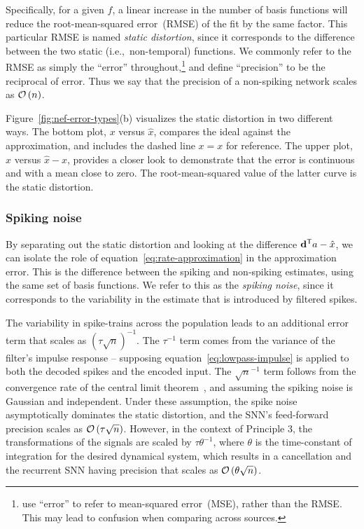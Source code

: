 Specifically, for a given $f$, a linear increase in the number of basis functions will reduce the root-mean-squared error~(RMSE) of the fit by the same factor.
This particular RMSE is named \emph{static distortion}, since it corresponds to the difference between the two static (i.e.,~non-temporal) functions.
We commonly refer to the RMSE as simply the ``error'' throughout,\footnote{%
\citet{eliasmith2003a} use ``error'' to refer to mean-squared error~(MSE), rather than the RMSE. This may lead to confusion when comparing across sources.}
and define ``precision'' to be the reciprocal of error.
Thus we say that the precision of a non-spiking network scales as $\mathcal{O}\left({n}\right)$.

Figure~\ref{fig:nef-error-types}(b) visualizes the static distortion in two different ways.
The bottom plot, $x$ versus $\hat{x}$, compares the ideal against the approximation, and includes the dashed line $x = x$ for reference.
The upper plot, $x$ versus $\hat{x} - x$, provides a closer look to demonstrate that the error is continuous and with a mean close to zero.
The root-mean-squared value of the latter curve is the static distortion.

\subsubsection{Spiking noise}

By separating out the static distortion and looking at the difference ${\mathbf{d}}^\mathsf{T}a - \hat{x}$, we can isolate the role of equation~\ref{eq:rate-approximation} in the approximation error.
This is the difference between the spiking and non-spiking estimates, using the same set of basis functions.
We refer to this as the \emph{spiking noise}, since it corresponds to the variability in the estimate that is introduced by filtered spikes.

The variability in spike-trains across the population leads to an additional error term that scales as $\left( \tau \sqrt{n} \right)^{-1}$.
The $\tau^{-1}$ term comes from the variance of the filter's impulse response -- supposing equation~\ref{eq:lowpass-impulse} is applied to both the decoded spikes and the encoded input.
The $\sqrt{n}^{-1}$ term follows from the convergence rate of the central limit theorem~\citep[CLT;][]{berry1941accuracy, esseen1942liapunov}, and assuming the spiking noise is Gaussian and independent.
Under these assumption, the spike noise asymptotically dominates the static distortion, and the SNN's feed-forward precision scales as $\mathcal{O}\left({\tau \sqrt{n}}\right)$.
However, in the context of Principle 3, the transformations of the signals are scaled by $\tau \theta^{-1}$, where $\theta$ is the time-constant of integration for the desired dynamical system, which results in a cancellation and the recurrent SNN having precision that scales as $\mathcal{O}\left({\theta \sqrt{n}}\right)$.

